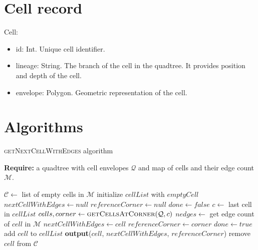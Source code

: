 \documentclass{article}
\begin{document}
    \section*{Cell record}
    Cell:
    \begin{itemize}
        \item id: Int.  Unique cell identifier.
        \item lineage: String.  The branch of the cell in the quadtree.  It provides position and depth of the cell. 
        \item envelope: Polygon.  Geometric representation of the cell.
    \end{itemize}
    
    \section*{Algorithms}
    \begin{algorithm} \caption{\textsc{getNextCellWithEdges} algorithm}
        \textbf{Require:} a quadtree with cell envelopes $\mathcal Q$ and map of cells and their edge count $\mathcal M$.
        \begin{algorithmic}[1]
            \State $\mathcal C \gets $ list of empty cells in $\mathcal M$
                \State initialize $cellList$ with $emptyCell$ 
                \State $nextCellWithEdges \gets null$
                \State $referenceCorner \gets null$
                \State $done \gets false$
                    \State $c \gets $ last cell in $cellList$ 
                    \State $cells, corner \gets \textsc{getCellsAtCorner}(\mathcal Q, c)$ 
                        \State $nedges \gets$ get edge count of $cell$ in $\mathcal M$ 
                            \State $nextCellWithEdges \gets cell$
                            \State $referenceCorner \gets corner$
                            \State $done \gets true$
                        \Else
                            \State add $cell$ to $cellList$
                        \EndIf
                    \EndFor
                \EndWhile
                    \State \textbf{output}($cell$, $nextCellWithEdges$, $referenceCorner$)
                    \State remove $cell$ from $\mathcal C$
                \EndFor
            \EndFor
        \EndFunction
        \end{algorithmic}
    \end{algorithm}
    
\end{document}
